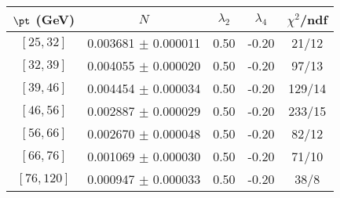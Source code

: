 \begin{tabular}{c||c|c|c|c}
$\pt$ (GeV) & $N$ & $\lambda_{2}$ & $\lambda_4$  & $\chi^2$/ndf  \\
\hline
$[25, 32]$ & 0.003681 $\pm$ 0.000011 & 0.50 & -0.20 & 21/12\\
$[32, 39]$ & 0.004055 $\pm$ 0.000020 & 0.50 & -0.20 & 97/13\\
$[39, 46]$ & 0.004454 $\pm$ 0.000034 & 0.50 & -0.20 & 129/14\\
$[46, 56]$ & 0.002887 $\pm$ 0.000029 & 0.50 & -0.20 & 233/15\\
$[56, 66]$ & 0.002670 $\pm$ 0.000048 & 0.50 & -0.20 & 82/12\\
$[66, 76]$ & 0.001069 $\pm$ 0.000030 & 0.50 & -0.20 & 71/10\\
$[76, 120]$ & 0.000947 $\pm$ 0.000033 & 0.50 & -0.20 & 38/8\\
\end{tabular}
